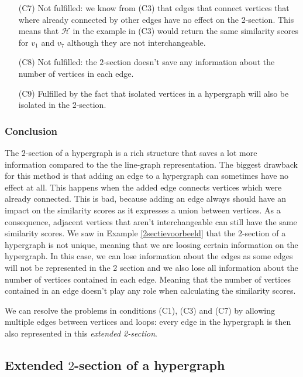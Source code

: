\documentclass[a4paper,11pt]{report}
\newcommand{\hgrafeen}{\mathcal{H}}
\begin{document}
\begin{itemize}
   
     \item[(C7)] Not fulfilled: we know from (C3) that edges that connect 
     vertices that where already connected by other edges have no effect on
   the 2-section. This means that $\hgrafeen$ in the example in (C3) would 
     return the same similarity scores for $v_1$ and $v_7$ although they are not 
     interchangeable.
     \item [(C8)] Not fulfilled: the $2$-section doesn't save any information 
     about the number of vertices in each edge. 
  \item[(C9)] Fulfilled by the fact that isolated vertices in a hypergraph will 
  also be isolated in the 2-section.
  \end{itemize}  

\subsubsection{Conclusion}
The $2$-section of a hypergraph is a rich structure that 
saves a lot more information compared to the the line-graph representation. The biggest drawback for this method is that 
adding an edge to a hypergraph can sometimes have no effect at all. This happens when 
the added edge connects vertices which were already connected. This is bad, because adding an edge always should have an impact on 
  the similarity scores as it expresses a union between vertices. As a consequence, adjacent vertices that aren't interchangeable
  can still have the same similarity scores. We saw in Example \ref{2sectievoorbeeld} that
  the 2-section of a hypergraph is not unique, meaning that we are loosing certain
  information on the hypergraph. In this case, we can lose information about 
  the edges as some edges will not be represented in the 2 section and we also lose 
  all information about 
  the number of vertices contained in each edge. Meaning that the number of vertices
  contained in an edge doesn't play any role when calculating the similarity scores. 
  
 We can resolve the problems in conditions (C1), (C3) and (C7) by allowing multiple edges
  between vertices and loops: every edge in the hypergraph is then also represented in this \emph{extended 2-section}.
  
  \subsection{Extended $2$-section of a hypergraph}
\end{document}
